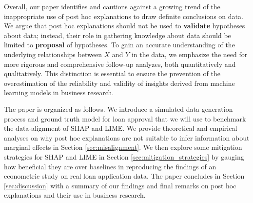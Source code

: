\documentclass[12pt]{article}  %
\begin{document}
Overall, our paper identifies and cautions against a growing trend of the inappropriate use of post hoc explanations to draw definite conclusions on data. We argue that post hoc explanations should not be used to \textbf{validate} hypotheses about data; instead, their role in gathering knowledge about data should be limited to \textbf{proposal} of hypotheses. To gain an accurate understanding of the underlying relationships between $X$ and $Y$ in the data, we emphasize the need for more rigorous and comprehensive follow-up analyzes, both quantitatively and qualitatively. This distinction is essential to ensure the prevention of the overestimation of the reliability and validity of insights derived from machine learning models in business research.

The paper is organized as follows. %
We introduce a simulated data generation process and ground truth model for loan approval that we will use to benchmark the data-alignment of SHAP and LIME. We provide theoretical and empirical analyses on why post hoc explanations are not suitable to infer information about marginal effects in Section \ref{sec:misalignment}. We then explore some mitigation strategies for SHAP and LIME in Section \ref{sec:mitigation_strategies} by gauging how beneficial they are over baselines in reproducing the findings of an econometric study on real loan application data. The paper concludes in Section \ref{sec:discussion} with a summary of our findings and final remarks on post hoc explanations and their use in business research. %
  


  
\end{document}
